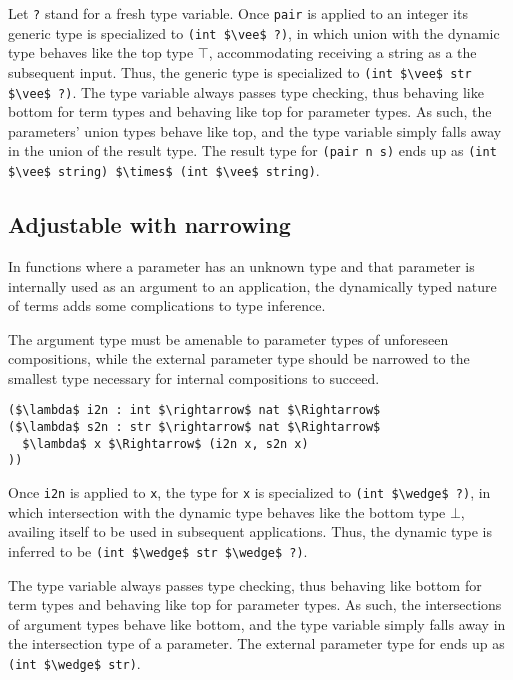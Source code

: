 \documentclass[sigplan]{acmart}
\theoremstyle{definition}
\begin{document}
Let \lstinline{?} stand for a fresh type variable.
Once \lstinline{pair} is applied to an integer its generic type is specialized to 
\lstinline{(int $\vee$ ?)}, 
in which union with the dynamic type behaves like the top type $\top$, 
accommodating receiving a string as a the subsequent input.
Thus, the generic type is specialized to 
\newline
\lstinline{(int $\vee$ str $\vee$ ?)}.
The type variable always passes type checking, 
thus behaving like bottom for term types
and behaving like top for parameter types.
As such, the parameters' union types behave like top,
and the type variable simply falls away in the union of the result type. 
The result type for \lstinline{(pair n s)} ends up as 
\newline
\lstinline{(int $\vee$ string) $\times$ (int $\vee$ string)}. 

\subsection{Adjustable with narrowing}

In functions where a parameter has an unknown type and that parameter is 
internally used as an argument to an application, the dynamically typed 
nature of terms adds some complications to type inference.

The argument type must be amenable to parameter types 
of unforeseen compositions,
while the external parameter type should be narrowed 
to the smallest type necessary for internal compositions to
succeed.

\begin{lstlisting}
($\lambda$ i2n : int $\rightarrow$ nat $\Rightarrow$ 
($\lambda$ s2n : str $\rightarrow$ nat $\Rightarrow$ 
  $\lambda$ x $\Rightarrow$ (i2n x, s2n x)
))

\end{lstlisting}

Once \lstinline{i2n} is applied to \lstinline{x}, 
the type for \lstinline{x} is specialized to \lstinline{(int $\wedge$ ?)}, 
in which intersection with the dynamic type behaves like the bottom type $\bot$,
availing itself to be used in subsequent applications. 
Thus, the dynamic type is inferred to be \lstinline{(int $\wedge$ str $\wedge$ ?)}.

The type variable always passes type checking, 
thus behaving like bottom for term types
and behaving like top for parameter types.
As such, the intersections of argument types behave like bottom,
and the type variable simply falls away in the intersection type of a parameter.
The external parameter type for ends up as \lstinline{(int $\wedge$ str)}. 
\end{document}
